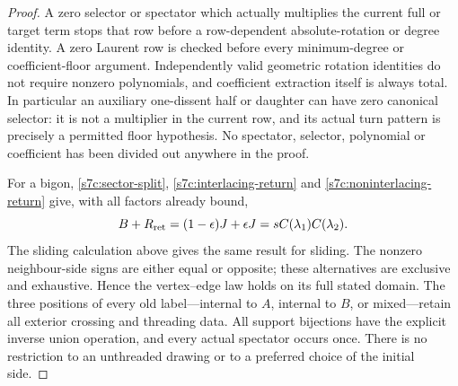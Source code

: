 \begin{proof}
A zero selector or spectator which actually multiplies the current full
or target term stops that row before a row-dependent absolute-rotation
or degree identity.  A zero Laurent row is checked before every
minimum-degree or coefficient-floor argument.  Independently valid
geometric rotation identities do not require nonzero polynomials,
and coefficient extraction itself is always total.  In particular an
auxiliary one-dissent half or daughter can have zero canonical selector:
it is not a multiplier in the current row, and its actual turn pattern
is precisely a permitted floor hypothesis.  No spectator, selector,
polynomial or coefficient has been divided out anywhere in the proof.

For a bigon, \eqref{s7c:sector-split},
\eqref{s7c:interlacing-return} and \eqref{s7c:noninterlacing-return}
give, with all factors already bound,
\begin{equation}\label{s7c:bigon-total}
 B+R_{\rm ret}=(1-\epsilon)J+\epsilon J
             =sC(\lambda_1)C(\lambda_2).
\end{equation}
The sliding calculation above gives the same result for sliding.
The nonzero neighbour-side signs are either equal or opposite; these
alternatives are exclusive and exhaustive.  Hence
the vertex--edge law holds on its full stated domain.
The three positions of every old label---internal to $A$, internal to
$B$, or mixed---retain all exterior crossing and threading data.
All support bijections have the explicit inverse union operation, and
every actual spectator occurs once.  There is no restriction to an
unthreaded drawing or to a preferred choice of the initial side.

\end{proof}




